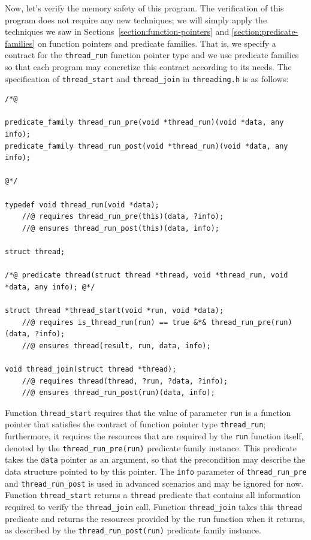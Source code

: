 \documentclass{article}
\begin{document}
Now, let's verify the memory safety of this program. The
verification of this program does not require any new
techniques; we will simply apply the techniques we saw in
Sections~\ref{section:function-pointers} and
\ref{section:predicate-families} on function pointers and
predicate families. That is, we specify a contract for the
\lstinline!thread_run! function pointer type and we use
predicate families so that each program may concretize this
contract according to its needs. The specification of
\lstinline!thread_start! and \lstinline!thread_join! in
\texttt{threading.h} is as follows:
\begin{lstlisting}
/*@

predicate_family thread_run_pre(void *thread_run)(void *data, any info);
predicate_family thread_run_post(void *thread_run)(void *data, any info);

@*/

typedef void thread_run(void *data);
    //@ requires thread_run_pre(this)(data, ?info);
    //@ ensures thread_run_post(this)(data, info);

struct thread;

/*@ predicate thread(struct thread *thread, void *thread_run, void *data, any info); @*/

struct thread *thread_start(void *run, void *data);
    //@ requires is_thread_run(run) == true &*& thread_run_pre(run)(data, ?info);
    //@ ensures thread(result, run, data, info);

void thread_join(struct thread *thread);
    //@ requires thread(thread, ?run, ?data, ?info);
    //@ ensures thread_run_post(run)(data, info);
\end{lstlisting}
Function \lstinline!thread_start! requires that the value of
parameter \lstinline!run! is a function pointer that satisfies
the contract of function pointer type \lstinline!thread_run!;
furthermore, it requires the resources that are required by the
\lstinline!run! function itself, denoted by the
\lstinline!thread_run_pre(run)! predicate family instance. This
predicate takes the \lstinline!data! pointer as an
argument, so that the precondition may describe the data
structure pointed to by this pointer. The \lstinline!info!
parameter of \lstinline!thread_run_pre! and
\lstinline!thread_run_post! is used in advanced scenarios and
may be ignored for now. Function \lstinline!thread_start!
returns a \lstinline!thread! predicate that contains all
information required to verify the \lstinline!thread_join!
call. Function \lstinline!thread_join! takes this
\lstinline!thread! predicate and returns the resources provided
by the \lstinline!run! function when it returns, as described
by the \lstinline!thread_run_post(run)! predicate family
instance.
\end{document}

